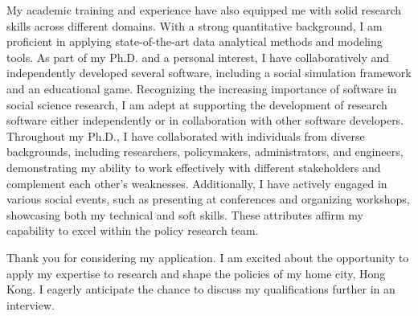 \documentclass[11pt, a4paper]{awesome-cv}
\begin{document}
\begin{cvletter}
My academic training and experience have also equipped me with solid research skills across different domains. With a strong quantitative background, I am proficient in applying state-of-the-art data analytical methods and modeling tools. As part of my Ph.D. and a personal interest, I have collaboratively and independently developed several software, including a social simulation framework and an educational game. Recognizing the increasing importance of software in social science research, I am adept at supporting the development of research software either independently or in collaboration with other software developers. Throughout my Ph.D., I have collaborated with individuals from diverse backgrounds, including researchers, policymakers, administrators, and engineers, demonstrating my ability to work effectively with different stakeholders and complement each other's weaknesses. Additionally, I have actively engaged in various social events, such as presenting at conferences and organizing workshops, showcasing both my technical and soft skills. These attributes affirm my capability to excel within the policy research team.

Thank you for considering my application. I am excited about the opportunity to apply my expertise to research and shape the policies of my home city, Hong Kong. I eagerly anticipate the chance to discuss my qualifications further in an interview.


\end{cvletter}


\makeletterclosing
\end{document}
